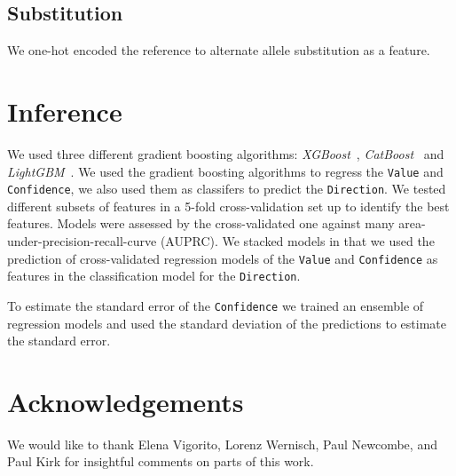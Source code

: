 \documentclass{article}
\begin{document}
\subsection*{Substitution}

We one-hot encoded the reference to alternate allele substitution as a feature.


\section*{Inference}

We used three different gradient boosting algorithms:
\emph{XGBoost}~\cite{ChenXGBoostScalableTree2016},
\emph{CatBoost}~\cite{ProkhorenkovaCatBoostunbiasedboosting2017} and
\emph{LightGBM}~\cite{KeLightGBMHighlyEfficient2017}. We used the gradient
boosting algorithms to regress the \texttt{Value} and \texttt{Confidence}, we
also used them as classifers to predict the \texttt{Direction}. We tested
different subsets of features in a 5-fold cross-validation set up to identify
the best features.  Models were assessed by the cross-validated one against
many area-under-precision-recall-curve (AUPRC). We stacked models in that we
used the prediction of cross-validated regression models of the \texttt{Value}
and \texttt{Confidence} as features in the classification model for the
\texttt{Direction}.

To estimate the standard error of the \texttt{Confidence} we trained an
ensemble of regression models and used the standard deviation of the
predictions to estimate the standard error.


\section*{Acknowledgements}

We would like to thank Elena Vigorito, Lorenz Wernisch, Paul Newcombe, and Paul
Kirk for insightful comments on parts of this work.

%
%
\printbibliography
\end{document}

